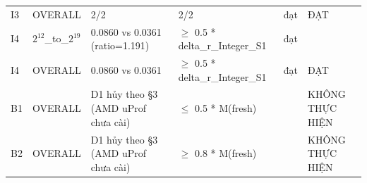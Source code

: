 \begin{longtable}{p{0.8cm}p{2.2cm}p{3.9cm}p{3.2cm}p{1.1cm}p{2.4cm}}
I3 & OVERALL & 2/2 & 2/2 & đạt & ĐẠT \\
I4 & $2^{12}$\_\allowbreak{}to\_\allowbreak{}$2^{19}$ & 0.0860 vs 0.0361 (ratio=\allowbreak{}1.191) & $\ge$\allowbreak{} 0.5 * delta\_\allowbreak{}r\_\allowbreak{}Integer\_\allowbreak{}S1 & đạt &  \\
I4 & OVERALL & 0.0860 vs 0.0361 & $\ge$\allowbreak{} 0.5 * delta\_\allowbreak{}r\_\allowbreak{}Integer\_\allowbreak{}S1 & đạt & ĐẠT \\
B1 & OVERALL & D1 hủy theo §3 (AMD uProf chưa cài) & $\le$\allowbreak{} 0.5 * M(fresh) &  & KHÔNG THỰC HIỆN \\
B2 & OVERALL & D1 hủy theo §3 (AMD uProf chưa cài) & $\ge$\allowbreak{} 0.8 * M(fresh) &  & KHÔNG THỰC HIỆN \\
\end{longtable}
